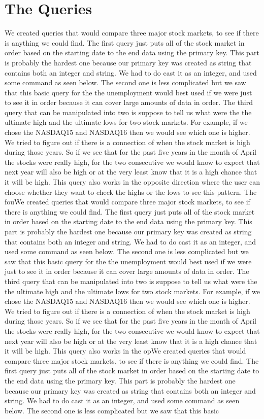 \documentclass[12pt]{report}
\begin{document}
\section{The Queries}
We created queries that would compare three major stock markets, to see if there is anything we could find. The first query just puts all of the stock market in order based on the starting date to the end data using the primary key. This part is probably the hardest one because our primary key was created as string that contains both an integer and string. We had to do cast it as an integer, and used some command as seen below. The second one is less complicated but we saw that this basic query for the the unemployment would best used if we were just to see it in order because it can cover large amounts of data in order. The third query that can be manipulated into two is suppose to tell us what were the the ultimate high and the ultimate lows for two stock markets. For example, if we chose the NASDAQ15 and NASDAQ16 then we would see which one is higher. We tried to figure out if there is a connection of when the stock market is high during those years. So if we see that for the past five years in the month of April the stocks were really high, for the two consecutive we would know to expect that next year will also be high or at the very least know that it is a high chance that it will be high. This query also works in the opposite direction where the user can choose whether they want to check the highs or the lows to see this pattern. The fouWe created queries that would compare three major stock markets, to see if there is anything we could find. The first query just puts all of the stock market in order based on the starting date to the end data using the primary key. This part is probably the hardest one because our primary key was created as string that contains both an integer and string. We had to do cast it as an integer, and used some command as seen below. The second one is less complicated but we saw that this basic query for the the unemployment would best used if we were just to see it in order because it can cover large amounts of data in order. The third query that can be manipulated into two is suppose to tell us what were the the ultimate high and the ultimate lows for two stock markets. For example, if we chose the NASDAQ15 and NASDAQ16 then we would see which one is higher. We tried to figure out if there is a connection of when the stock market is high during those years. So if we see that for the past five years in the month of April the stocks were really high, for the two consecutive we would know to expect that next year will also be high or at the very least know that it is a high chance that it will be high. This query also works in the opWe created queries that would compare three major stock markets, to see if there is anything we could find. The first query just puts all of the stock market in order based on the starting date to the end data using the primary key. This part is probably the hardest one because our primary key was created as string that contains both an integer and string. We had to do cast it as an integer, and used some command as seen below. The second one is less complicated but we saw that this basic 
\end{document}
